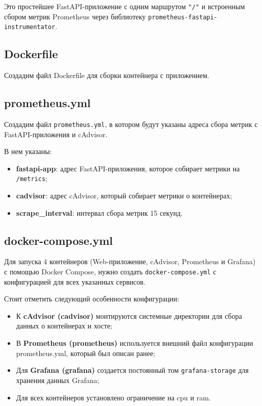 

Это простейшее FastAPI-приложение с одним маршрутом \texttt{"/"}
и встроенным сбором метрик Prometheus через библиотеку
\texttt{prometheus-fastapi-instrumentator}.

\clearpage

\subsection{Dockerfile}

Создадим файл Dockerfile для сборки контейнера с приложением.



\subsection{prometheus.yml}

Создадим файл \texttt{prometheus.yml},
в котором будут указаны адреса сбора метрик с FastAPI-приложения и cAdvisor.



В нем указаны:

\begin{itemize}
    \item \textbf{fastapi-app}: адрес FastAPI-приложения,
    которое собирает метрики на \texttt{/metrics};
    \item \textbf{cadvisor}: адрес cAdvisor,
    который собирает метрики о контейнерах;
    \item \textbf{scrape\_interval}: интервал сбора метрик 15 секунд.
\end{itemize}

\subsection{docker-compose.yml}

Для запуска 4 контейнеров (Web-приложение, cAdvisor, Prometheus и Grafana)
с помощью Docker Compose, нужно создать \texttt{docker-compose.yml}
с конфигурацией для всех указанных сервисов.



Стоит отметить следующий особенности конфигурации:

\begin{itemize}
    \item К \textbf{cAdvisor (cadvisor)} монтируются системные директории
    для сбора данных о контейнерах и хосте;
    \item В \textbf{Prometheus (prometheus)}
    используется внешний файл конфигурации prometheus.yml,
    который был описан ранее;
    \item Для \textbf{Grafana (grafana)}
    создается постоянный том \texttt{grafana-storage}
    для хранения данных Grafana;
    \item Для всех контейнеров установлено ограничение на cpu и ram.
\end{itemize}

